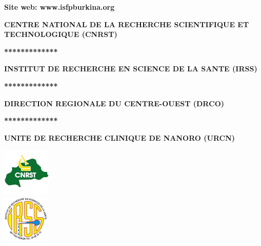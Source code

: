 \documentclass[12pt]{report}
\begin{document}
\begin{titlepage}
\begin{minipage}{0.45\textwidth}
\begin{flushleft}
\begin{center}
						\textbf{\scriptsize Site web: www.isfpburkina.org}    
					\end{center}
				\end{flushleft}
			\end{minipage}
			\hfill
			\begin{minipage}{0.45\textwidth}
				\begin{flushright} %
					\begin{center}
						\textbf{\small CENTRE NATIONAL DE LA RECHERCHE SCIENTIFIQUE ET TECHNOLOGIQUE (CNRST)}
					\end{center}
					\begin{center}
						\textbf{\small **************}
					\end{center}
					\begin{center}
						\textbf{\small INSTITUT DE RECHERCHE EN SCIENCE DE LA SANTE (IRSS)}
					\end{center}
					\begin{center}
						\textbf{\small **************}
					\end{center}
					\begin{center}
						\textbf{\small DIRECTION REGIONALE DU CENTRE-OUEST (DRCO)}
					\end{center}
					\begin{center}
						\textbf{\small **************}
					\end{center}
					\begin{center}
						\textbf{\small UNITE DE RECHERCHE CLINIQUE DE NANORO (URCN)}
					\end{center}
					\begin{center}
						\includegraphics[width=2.3cm]{logo-CNRST2.png} \\
						\includegraphics[width=2.3cm]{irss.png} %
					\end{center}
				\end{flushright}
			\end{minipage}
			

\end{titlepage}
\end{document}
